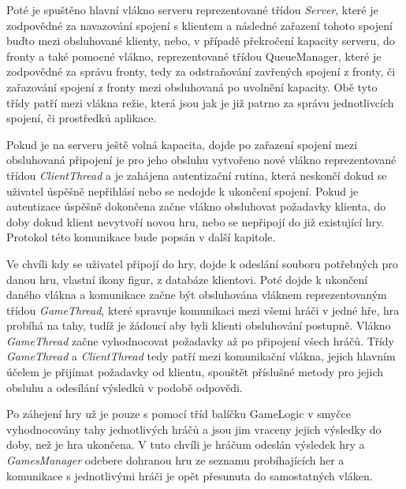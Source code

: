 \documentclass[12pt]{article}
\begin{document}
Poté je spuštěno hlavní vlákno serveru reprezentované třídou \textit{Server}, které je zodpovědné za navazování spojení s klientem a následné zařazení tohoto spojení buďto mezi obsluhované klienty, nebo, v případě překročení kapacity serveru, do fronty a také pomocné vlákno, reprezentované třídou \textit{}{QueueManager}, které je zodpovědné za správu fronty, tedy za odstraňování zavřených spojení z fronty, či zařazování spojení z fronty mezi obsluhovaná po uvolnění kapacity. Obě tyto třídy patří mezi vlákna režie, která jsou jak je již patrno za správu jednotlivcích spojení, či prostředků aplikace.

Pokud je na serveru ještě volná kapacita, dojde po zařazení spojení mezi obsluhovaná připojení je pro jeho obsluhu vytvořeno nové vlákno reprezentované třídou \textit{ClientThread} a je zahájena autentizační rutina, která neskončí dokud se uživatel úspěšně nepřihlásí nebo se nedojde k ukončení spojení. Pokud je autentizace úspěšně dokončena začne vlákno obsluhovat požadavky klienta, do doby dokud klient nevytvoří novou hru, nebo se nepřipojí do již existující hry. Protokol této komunikace bude popsán v další kapitole.

Ve chvíli kdy se uživatel připojí do hry, dojde k odeslání souboru potřebných pro danou hru, vlastní ikony figur, z databáze klientovi. Poté dojde k ukončení daného vlákna a komunikace začne být obsluhována vláknem reprezentovaným třídou \textit{GameThread}, které spravuje komunikaci mezi všemi hráči v jedné hře, hra probíhá na tahy, tudíž je žádoucí aby byli klienti obsluhování postupně. Vlákno \textit{GameThread} začne vyhodnocovat požadavky až po připojení všech hráčů. Třídy \textit{GameThread} a \textit{ClientThread} tedy patří mezi komunikační vlákna, jejich hlavním účelem je přijímat požadavky od klientu, spouštět příslušné metody pro jejich obsluhu a odesílání výsledků v podobě odpovědi.

Po záhejení hry už je pouze s pomocí tříd balíčku GameLogic v smyčce vyhodnocovány tahy jednotlivých hráčů a jsou jim vraceny jejich výsledky do doby, než je hra ukončena. V tuto chvíli je hráčum odeslán výsledek hry a \textit{GamesManager} odebere dohranou hru ze seznamu probíhajících her a komunikace s jednotlivými hráči je opět přesunuta do samostatných vláken.
\end{document}
